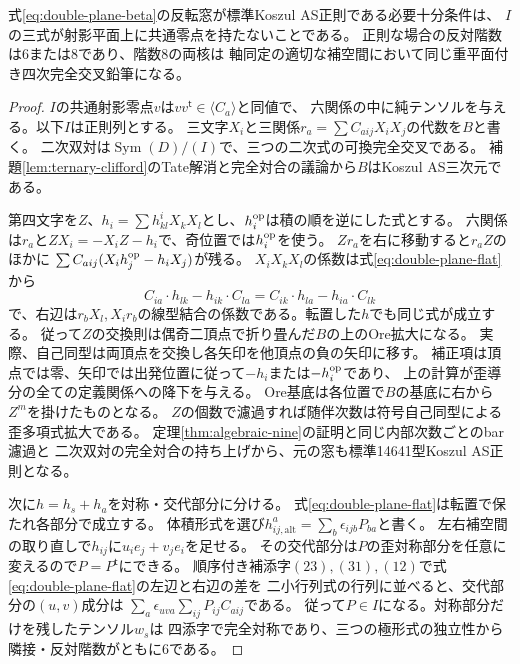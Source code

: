 \begin{theorem}[重平面での正則性と反対階数]\label{thm:double-plane-ore}
式\eqref{eq:double-plane-beta}の反転窓が標準Koszul AS正則である必要十分条件は、
$I$の三式が射影平面上に共通零点を持たないことである。
正則な場合の反対階数は6または8であり、階数8の両核は
軸同定の適切な補空間において同じ重平面付き四次完全交叉鉛筆になる。
\end{theorem}
\begin{proof}
$I$の共通射影零点$v$は$v v^{\mathsf t}\in\langle C_a\rangle$と同値で、
六関係の中に純テンソルを与える。以下$I$は正則列とする。
三文字$X_i$と三関係$r_a=\sum C_{aij}X_iX_j$の代数を$B$と書く。
二次双対は$\operatorname{Sym}(D)/(I)$で、三つの二次式の可換完全交叉である。
補題\ref{lem:ternary-clifford}のTate解消と完全対合の議論から$B$はKoszul AS三次元である。

第四文字を$Z$、$h_i=\sum h^i_{kl}X_kX_l$とし、$h_i^{\rm op}$は積の順を逆にした式とする。
六関係は$r_a$と$ZX_i=-X_iZ-h_i$で、奇位置では$h_i^{\rm op}$を使う。
$Zr_a$を右に移動すると$r_a Z$のほかに
$\sum C_{aij}(X_i h_j^{\rm op}-h_i X_j)$が残る。
$X_iX_kX_l$の係数は式\eqref{eq:double-plane-flat}から
\[
 C_{ia}\cdot h_{lk}-h_{ik}\cdot C_{la}
 = C_{ik}\cdot h_{la}-h_{ia}\cdot C_{lk}
\]
で、右辺は$r_bX_l,X_i r_b$の線型結合の係数である。転置した$h$でも同じ式が成立する。
従って$Z$の交換則は偶奇二頂点で折り畳んだ$B$の上のOre拡大になる。
実際、自己同型は両頂点を交換し各矢印を他頂点の負の矢印に移す。
補正項は頂点では零、矢印では出発位置に従って$-h_i$または$-h_i^{\rm op}$であり、
上の計算が歪導分の全ての定義関係への降下を与える。
Ore基底は各位置で$B$の基底に右から$Z^m$を掛けたものとなる。
$Z$の個数で濾過すれば随伴次数は符号自己同型による歪多項式拡大である。
定理\ref{thm:algebraic-nine}の証明と同じ内部次数ごとのbar濾過と
二次双対の完全対合の持ち上げから、元の窓も標準14641型Koszul AS正則となる。

次に$h=h_s+h_a$を対称・交代部分に分ける。
式\eqref{eq:double-plane-flat}は転置で保たれ各部分で成立する。
体積形式を選び$h^a_{ij,\mathrm{alt}}=\sum_b\epsilon_{ijb}P_{ba}$と書く。
左右補空間の取り直しで$h_{ij}$に$u_i e_j+v_j e_i$を足せる。
その交代部分は$P$の歪対称部分を任意に変えるので$P=P^{\mathsf t}$にできる。
順序付き補添字$(23),(31),(12)$で式\eqref{eq:double-plane-flat}の左辺と右辺の差を
二小行列式の行列に並べると、交代部分の$(u,v)$成分は
$\sum_a\epsilon_{uva}\sum_{ij}P_{ij}C_{aij}$である。
従って$P\in I$になる。対称部分だけを残したテンソル$w_s$は
四添字で完全対称であり、三つの極形式の独立性から隣接・反対階数がともに6である。


\end{proof}
